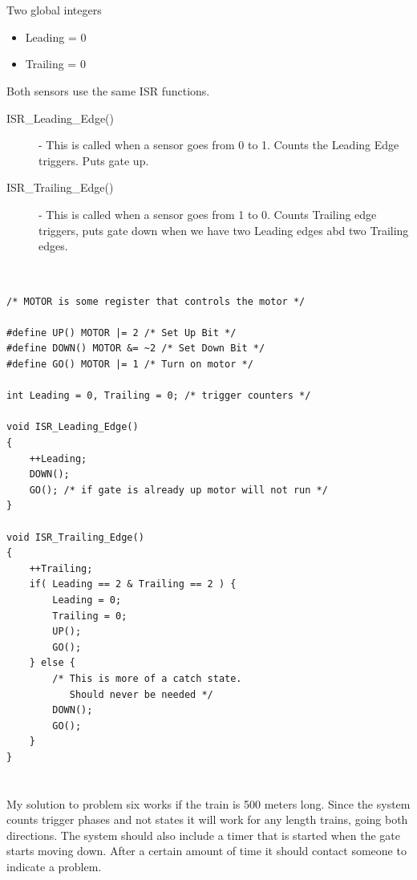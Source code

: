 \documentclass[a4paper,12pt]{article}
\begin{document}
\section{}
\subsection{}
Two global integers
\begin{itemize}
\item Leading = 0
\item Trailing = 0
\end{itemize}

Both sensors use the same ISR functions.

\begin{description}
\item[ISR\_Leading\_Edge()] - This is called when a sensor goes from 0 to 1.  Counts the Leading Edge triggers. Puts gate up.
\item[ISR\_Trailing\_Edge()] - This is called when a sensor goes from 1 to 0.  Counts Trailing edge triggers, puts gate down when we have two Leading
edges abd two Trailing edges.
\end{description}

\subsection{}
\lstset{language=C}
\begin{lstlisting}

/* MOTOR is some register that controls the motor */

#define UP() MOTOR |= 2 /* Set Up Bit */
#define DOWN() MOTOR &= ~2 /* Set Down Bit */
#define GO() MOTOR |= 1 /* Turn on motor */

int Leading = 0, Trailing = 0; /* trigger counters */

void ISR_Leading_Edge()
{
    ++Leading;
    DOWN();
    GO(); /* if gate is already up motor will not run */
}

void ISR_Trailing_Edge()
{
    ++Trailing;
    if( Leading == 2 & Trailing == 2 ) {
        Leading = 0;
        Trailing = 0;
        UP();
        GO();
    } else { 
        /* This is more of a catch state.  
           Should never be needed */
        DOWN();
        GO();
    }
}

\end{lstlisting}

\section{}
My solution to problem six works if the train is 500 meters long.  Since the system counts trigger phases and not states it will work for any length trains, going both directions.  The system should also include a timer that is started when the gate starts moving down.  After a certain amount of time it should contact someone to indicate a problem.
\end{document}
